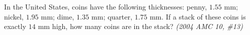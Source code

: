 \documentclass[9pt]{beamer}
\begin{document}
\begin{frame}[t]{9.3}
\begin{block}{}
    In the United States, coins have the following thicknesses: penny, $1.55$ mm; nickel, $1.95$ mm; dime, $1.35$ mm; quarter, $1.75$ mm. If a stack of these coins is exactly $14$ mm high, how many coins are in the stack? \textit{(2004 AMC 10, \#13)}

       
\end{block}
\end{frame}
\newpage
\end{document}
